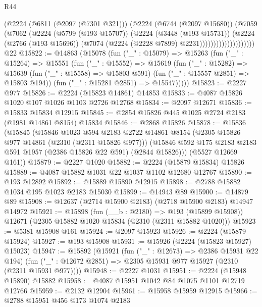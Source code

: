 \begin{lexlean}{R44}
\begin{coremodule}
                          (@2224
                            (@6811 (@2097 (@7301 @321)))
                            (@2224
                              (@6744 (@2097 @15680))
                              (@7059
                                (@7062
                                  (@2224
                                    (@5799 (@193 @15707))
                                    (@2224
                                      (@3448 (@193 @15731))
                                      (@2224
                                        (@2766 (@193 @15696))
                                        (@7074 (@2224 (@2228 @7899) @2231))))))))))))))))))))
    @22
@15822 := @14863
    (@15078
      (fun ("_" : @15079) =>
      @15263
        (fun ("_" : @15264) =>
        @15551
          (fun ("_" : @15552) =>
          @15619
            (fun ("_" : @15282) =>
            @15639 (fun ("_" : @15558) => @15803 @591) (fun ("_" : @15557 @2851) => @15803 @194))
            (fun ("_" : @15281 @2851) => @15547)))))
@15823 := @2227 @977
@15826 := @2224 (@15823 @14861) @14853
@15833 := @4087 @15826 @1020 @107 @1026 @1103 @2726 @12768
@15834 := @2097 @12671
@15836 := @15833 @15834 @12915
@15845 := @2854 @15826 @445 @1025 @2724 @2183 (@1981 @14861 @8154) @15834
@15846 := @2868 @15826
@15878 := @15836
    (@15845
      (@15846
        @1023
        @594
        @2183
        @2722
        @14861
        @8154
        (@2305 @15826 @977 @14861 (@2310 (@2311 @15826 @977)))
        (@15846 @592 @175 @2183 @2183 @591 @1957 (@2386 @15826 @22 @591) (@2844 @15826)))
      (@5527 @12669 @161))
@15879 := @2227 @1020
@15882 := @2224 (@15879 @15834) @15826
@15889 := @4087 @15882 @1031 @22 @1037 @1102 @12680 @12767
@15890 := @193 @12892
@15892 := @15889 @15890 @12915
@15898 := @2788 @15882 @1034 @195 @1023 @2183 @15030
@15899 := @14943 @89
@15900 := @14879 @89
@15908 := @12637 (@2714 @15900 @2183) (@2718 @15900 @2183) @14947 @14972
@15921 := @15898
    (fun (__b : @2180) => @193 (@15899 @15908))
    @12671
    (@2305 @15882 @1020 @15834 (@2310 (@2311 @15882 @1020)))
@15923 := @5381 @15908 @161
@15924 := @2097 @15923
@15926 := @2224 (@15879 @15924)
@15927 := @193 @15908
@15931 := @15926 (@2224 (@15823 @15927) @15023)
@15947 := @15892
    (@15921
      (fun ("_" : @12673) => @2386 @15931 @22 @194)
      (fun ("_" : @12672 @2851) => @2305 @15931 @977 @15927 (@2310 (@2311 @15931 @977))))
@15948 := @2227 @1031
@15951 := @2224 (@15948 @15890) @15882
@15958 := @4087 @15951 @1042 @84 @1075 @1101 @12719 @12766
@15959 := @2132 @12904
@15961 := @15958 @15959 @12915
@15966 := @2788 @15951 @456 @173 @1074 @2183

\end{coremodule}
\end{lexlean}
